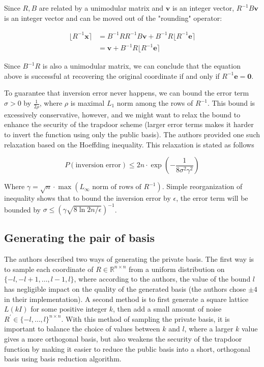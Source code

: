 Since $R, B$ are related by a unimodular matrix and $\mathbf{v}$ is an integer vector, $R^{-1}B\mathbf{v}$ is an integer vector and can be moved out of the "rounding" operator:

$$
\begin{aligned}
\lfloor R^{-1}\mathbf{x} \rceil &= B^{-1}RR^{-1}B\mathbf{v} + B^{-1}R\lfloor R^{-1}\mathbf{e}\rceil \\
&= \mathbf{v} + B^{-1}R\lfloor R^{-1}\mathbf{e} \rceil
\end{aligned}
$$

Since $B^{-1}R$ is also a unimodular matrix, we can conclude that the equation above is successful at recovering the original coordinate if and only if $R^{-1}\mathbf{e} = \mathbf{0}$.

To guarantee that inversion error never happens, we can bound the error term $\sigma > 0$ by $\frac{1}{2\rho}$, where $\rho$ is maximal $L_1$ norm among the rows of $R^{-1}$. This bound is excessively conservative, however, and we might want to relax the bound to enhance the security of the trapdoor scheme (larger error terms makes it harder to invert the function using only the public basis). The authors provided one such relaxation based on the Hoeffding inequality. This relaxation is stated as follows

$$
P(\text{inversion error}) \leq 2n \cdot \exp(-\frac{1}{8\sigma^2\gamma^2})
$$

Where $\gamma = \sqrt{n} \cdot \max(L_\infty \text{ norm of rows of } R^{-1})$. Simple reorganization of inequality shows that to bound the inversion error by $\epsilon$, the error term will be bounded by $\sigma \leq (\gamma\sqrt{8\ln{2n/\epsilon}})^{-1}$.

\subsection{Generating the pair of basis}
The authors described two ways of generating the private basis. The first way is to sample each coordinate of $R \in \mathbb{R}^{n \times n}$ from a uniform distribution on $\{-l, -l + 1, \ldots, l-1, l\}$, where according to the authors, the value of the bound $l$ has negligible impact on the quality of the generated basis (the authors chose $\pm 4$ in their implementation). A second method is to first generate a square lattice $L(kI)$ for some positive integer $k$, then add a small amount of noise $R^\prime \in \{-l, \ldots, l\}^{n \times n}$. With this method of sampling the private basis, it is important to balance the choice of values between $k$ and $l$, where a larger $k$ value gives a more orthogonal basis, but also weakens the security of the trapdoor function by making it easier to reduce the public basis into a short, orthogonal basis using basis reduction algorithm.

